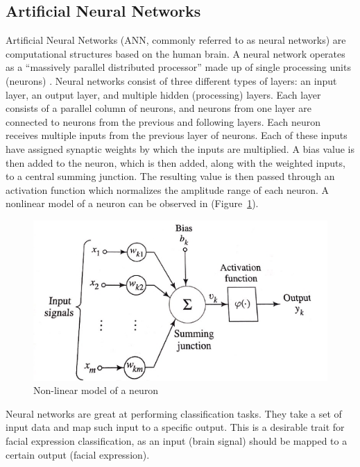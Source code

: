 \subsection{Artificial Neural Networks}
Artificial Neural Networks (ANN, commonly referred to as neural networks) are computational structures based on the human brain. A neural network operates as a “massively parallel distributed processor” made up of single processing units (neurons) \cite{annbook}. Neural networks consist of three different types of layers: an input layer, an output layer, and multiple hidden (processing) layers. Each layer consists of a parallel column of neurons, and neurons from one layer are connected to neurons from the previous and following layers. 
Each neuron receives multiple inputs from the previous layer of neurons. Each of these inputs have assigned synaptic weights by which the inputs are multiplied. A bias value is then added to the neuron, which is then added, along with the weighted inputs, to a central summing junction. The resulting value is then passed through an activation function which normalizes the amplitude range of each neuron. A nonlinear model of a neuron can be observed in  (Figure~\ref{fig:neuron}).
 
\begin{figure}[H]
	\centering
		\includegraphics[width=0.6\columnwidth]{neuron.png}
	\caption{Non-linear model of a neuron \cite{annbook}}
	\label{fig:neuron}
\end{figure} 

Neural networks are great at performing classification tasks. They take a set of input data and map such input to a specific output. This is a desirable trait for facial expression classification, as an input (brain signal) should be mapped to a certain output (facial expression). 


